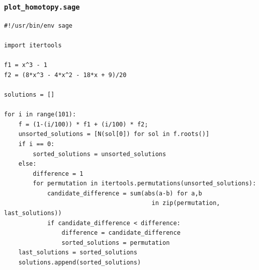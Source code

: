 \documentclass{beamer}
\begin{document}
\begin{frame}[fragile]
\frametitle{\tt plot_homotopy.sage}
\scriptsize
\begin{verbatim}
#!/usr/bin/env sage

import itertools

f1 = x^3 - 1
f2 = (8*x^3 - 4*x^2 - 18*x + 9)/20

solutions = []

for i in range(101):
    f = (1-(i/100)) * f1 + (i/100) * f2;
    unsorted_solutions = [N(sol[0]) for sol in f.roots()]
    if i == 0:
        sorted_solutions = unsorted_solutions
    else:
        difference = 1
        for permutation in itertools.permutations(unsorted_solutions):
            candidate_difference = sum(abs(a-b) for a,b
                                         in zip(permutation, last_solutions))
            if candidate_difference < difference:
                difference = candidate_difference
                sorted_solutions = permutation
    last_solutions = sorted_solutions
    solutions.append(sorted_solutions)
\end{verbatim}
\end{frame}
\end{document}
